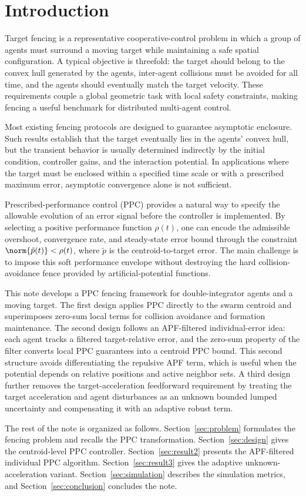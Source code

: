 \section{Introduction}
\label{sec:intro}

Target fencing is a representative cooperative-control problem in which a
group of agents must surround a moving target while maintaining a safe
spatial configuration.  A typical objective is threefold: the target should
belong to the convex hull generated by the agents, inter-agent collisions
must be avoided for all time, and the agents should eventually match the
target velocity.  These requirements couple a global geometric task with
local safety constraints, making fencing a useful benchmark for distributed
multi-agent control.

Most existing fencing protocols are designed to guarantee asymptotic
enclosure.  Such results establish that the target eventually lies in the
agents' convex hull, but the transient behavior is usually determined
indirectly by the initial condition, controller gains, and the interaction
potential.  In applications where the target must be enclosed within a
specified time scale or with a prescribed maximum error, asymptotic
convergence alone is not sufficient.

Prescribed-performance control (PPC) provides a natural way to specify the
allowable evolution of an error signal before the controller is implemented.
By selecting a positive performance function $\rho(t)$, one can encode the
admissible overshoot, convergence rate, and steady-state error bound through
the constraint $\norm{\tilde p(t)}<\rho(t)$, where $\tilde p$ is the
centroid-to-target error.  The main challenge is to impose this soft
performance envelope without destroying the hard collision-avoidance fence
provided by artificial-potential functions.

This note develops a PPC fencing framework for double-integrator agents and
a moving target.  The first design applies PPC directly to the swarm centroid
and superimposes zero-sum local terms for collision avoidance and formation
maintenance.  The second design follows an APF-filtered individual-error
idea: each agent tracks a filtered target-relative error, and the zero-sum
property of the filter converts local PPC guarantees into a centroid PPC
bound.  This second structure avoids differentiating the repulsive APF term,
which is useful when the potential depends on relative positions and active
neighbor sets.  A third design further removes the target-acceleration
feedforward requirement by treating the target acceleration and agent
disturbances as an unknown bounded lumped uncertainty and compensating it
with an adaptive robust term.

The rest of the note is organized as follows.  Section~\ref{sec:problem}
formulates the fencing problem and recalls the PPC transformation.
Section~\ref{sec:design} gives the centroid-level PPC controller.
Section~\ref{sec:result2} presents the APF-filtered individual PPC
algorithm.  Section~\ref{sec:result3} gives the adaptive unknown-acceleration
variant.  Section~\ref{sec:simulation} describes the simulation metrics, and
Section~\ref{sec:conclusion} concludes the note.
